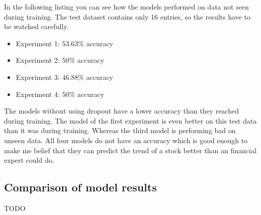 In the following listing you can see how the models performed on data not seen during training. The test dataset contains only 16 entries, so the results have to be watched carefully.
\begin{itemize}
	\item Experiment 1: $53.63\%$ accuracy
	\item Experiment 2: $50\%$ accuracy
	\item Experiment 3: $46.88\%$ accuracy
	\item Experiment 4: $50\%$ accuracy
\end{itemize}
The models without using dropout have a lower accuracy than they reached during training. The model of the first experiment is even better on this test data than it was during training. Whereas the third model is performing bad on unseen data. All four models do not have an accuracy which is good enough to make me belief that they can predict the trend of a stock better than an financial expert could do.


\subsection{Comparison of model results}
\label{subsec:compmodelresults}	
TODO

